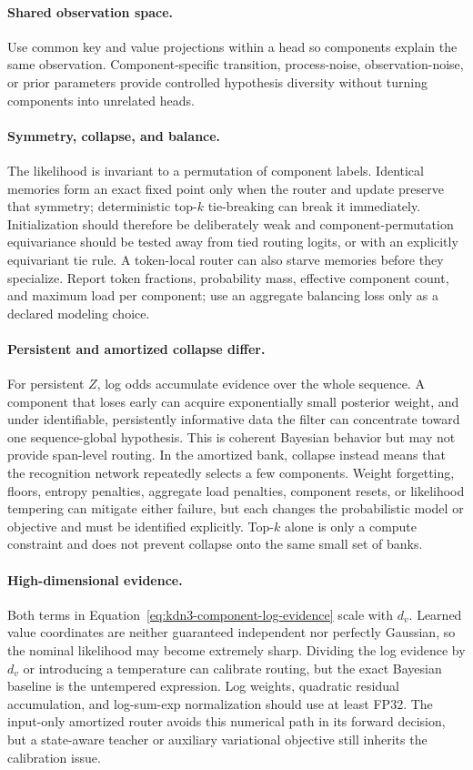 \documentclass[11pt]{article}
\begin{document}
\paragraph{Shared observation space.}
Use common key and value projections within a head so components explain the same observation.
Component-specific transition, process-noise, observation-noise, or prior parameters provide
controlled hypothesis diversity without turning components into unrelated heads.

\paragraph{Symmetry, collapse, and balance.}
The likelihood is invariant to a permutation of component labels.  Identical memories form an
exact fixed point only when the router and update preserve that symmetry; deterministic top-$k$
tie-breaking can break it immediately.  Initialization should therefore be deliberately weak and
component-permutation equivariance should be tested away from tied routing logits, or with an
explicitly equivariant tie rule.  A token-local router can also starve memories before they
specialize.  Report token fractions, probability mass, effective component count, and maximum load
per component; use an aggregate balancing loss only as a declared modeling choice.

\paragraph{Persistent and amortized collapse differ.}
For persistent $Z$, log odds accumulate evidence over the whole sequence.  A component that loses
early can acquire exponentially small posterior weight, and under identifiable, persistently
informative data the filter can concentrate toward one sequence-global hypothesis.  This is
coherent Bayesian behavior but may not provide span-level routing.  In the amortized bank, collapse
instead means that the recognition network repeatedly selects a few components.  Weight
forgetting, floors, entropy penalties, aggregate load penalties, component resets, or likelihood
tempering can mitigate either failure, but each changes the probabilistic model or objective and
must be identified explicitly.  Top-$k$ alone is only a compute constraint and does not prevent
collapse onto the same small set of banks.

\paragraph{High-dimensional evidence.}
Both terms in Equation~\eqref{eq:kdn3-component-log-evidence} scale with $d_v$.  Learned value
coordinates are neither guaranteed independent nor perfectly Gaussian, so the nominal likelihood
may become extremely sharp.  Dividing the log evidence by $d_v$ or introducing a temperature can
calibrate routing, but the exact Bayesian baseline is the untempered expression.  Log weights,
quadratic residual accumulation, and log-sum-exp normalization should use at least FP32.  The
input-only amortized router avoids this numerical path in its forward decision, but a
state-aware teacher or auxiliary variational objective still inherits the calibration issue.
\end{document}
